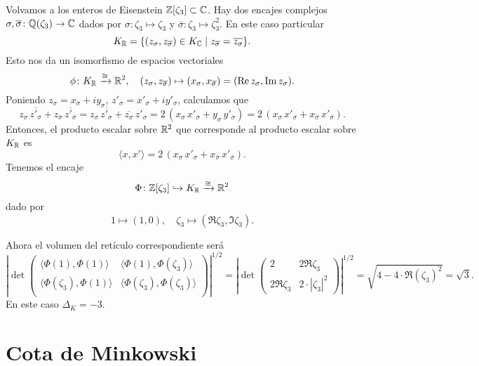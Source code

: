 \begin{ejemplo}
  \label{ejemplo:encaje-de-enteros-de-Eisenstein}
  Volvamos a los enteros de Eisenstein $\mathbb{Z} [\zeta_3] \subset \mathbb{C}$.
  Hay dos encajes complejos
  $\sigma, \overline{\sigma}\colon \mathbb{Q} (\zeta_3) \to \mathbb{C}$ dados por
  $\sigma\colon \zeta_3 \mapsto \zeta_3$ y
  $\overline{\sigma}\colon \zeta_3 \mapsto \zeta_3^2$. En este caso particular
  $$K_{\mathbb{R}} = \{ (z_\sigma, z_{\overline{\sigma}}) \in K_{\mathbb{C}} \mid z_{\overline{\sigma}} = \overline{z_\sigma} \}.$$
  Esto nos da un isomorfismo de espacios vectoriales
  \[ \phi\colon K_{\mathbb{R}} \xrightarrow{\cong} \mathbb{R}^2, \quad
     (z_\sigma, z_{\overline{\sigma}}) \mapsto (x_\sigma, x_{\overline{\sigma}}) = (\operatorname{Re} z_\sigma, \operatorname{Im} z_\sigma). \]
  Poniendo
  $z_\sigma = x_\sigma + i y_\sigma$, $z'_\sigma = x'_\sigma + i y'_\sigma$,
  calculamos que
  \[ z_\sigma \, \overline{z'_\sigma} + z_{\overline{\sigma}} \, \overline{z'_{\overline{\sigma}}} =
     z_\sigma \, \overline{z'_\sigma} + \overline{z_\sigma} \, z'_\sigma =
     2\,(x_\sigma\,x'_\sigma + y_\sigma\,y'_\sigma) =
     2\,(x_\sigma\,x'_\sigma + x_{\overline{\sigma}}\,x'_{\overline{\sigma}}). \]
  Entonces, el producto escalar sobre $\mathbb{R}^2$ que corresponde al producto escalar
  sobre $K_{\mathbb{R}}$ es
  $$\langle x, x'\rangle = 2\,(x_\sigma\,x'_\sigma + x_{\overline{\sigma}}\,x'_{\overline{\sigma}}).$$
  Tenemos el encaje
  $$\Phi\colon \mathbb{Z} [\zeta_3] \hookrightarrow K_{\mathbb{R}} \xrightarrow{\cong} \mathbb{R}^2$$
  dado por
  \[ 1 \mapsto (1, 0), \quad
     \zeta_3 \mapsto (\Re \zeta_3, \Im \zeta_3). \]

  Ahora el volumen del retículo correspondiente será
  \[ \left|\det \begin{pmatrix}
    \langle \Phi (1), \Phi (1) \rangle & \langle \Phi (1), \Phi (\zeta_3) \rangle \\
    \langle \Phi (\zeta_3), \Phi (1) \rangle & \langle \Phi (\zeta_3), \Phi (\zeta_3) \rangle \\
  \end{pmatrix}\right|^{1/2} =
  \left|\det \begin{pmatrix}
    2 & 2 \Re \zeta_3 \\
    2 \Re \zeta_3 & 2\cdot |\zeta_3|^2
  \end{pmatrix}\right|^{1/2} = \sqrt{4 - 4\cdot \Re (\zeta_3)^2} = \sqrt{3}. \]
  En este caso $\Delta_K = -3$.
\end{ejemplo}


\section{Cota de Minkowski}


